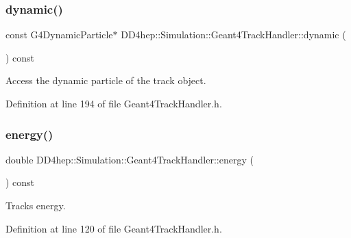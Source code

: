\hypertarget{class_d_d4hep_1_1_simulation_1_1_geant4_track_handler_a5821e52ab86d15c7f80cd758727df2c5}{}\label{class_d_d4hep_1_1_simulation_1_1_geant4_track_handler_a5821e52ab86d15c7f80cd758727df2c5} 
\subsubsection{\texorpdfstring{dynamic()}{dynamic()}}
{\footnotesize\ttfamily const G4\+Dynamic\+Particle$\ast$ D\+D4hep\+::\+Simulation\+::\+Geant4\+Track\+Handler\+::dynamic (\begin{DoxyParamCaption}{ }\end{DoxyParamCaption}) const\hspace{0.3cm}{\ttfamily [inline]}}



Access the dynamic particle of the track object. 



Definition at line 194 of file Geant4\+Track\+Handler.\+h.

\hypertarget{class_d_d4hep_1_1_simulation_1_1_geant4_track_handler_a9f570cb8f5bda9880c39a08c970d68fe}{}\label{class_d_d4hep_1_1_simulation_1_1_geant4_track_handler_a9f570cb8f5bda9880c39a08c970d68fe} 
\subsubsection{\texorpdfstring{energy()}{energy()}}
{\footnotesize\ttfamily double D\+D4hep\+::\+Simulation\+::\+Geant4\+Track\+Handler\+::energy (\begin{DoxyParamCaption}{ }\end{DoxyParamCaption}) const\hspace{0.3cm}{\ttfamily [inline]}}



Track\textquotesingle{}s energy. 



Definition at line 120 of file Geant4\+Track\+Handler.\+h.



